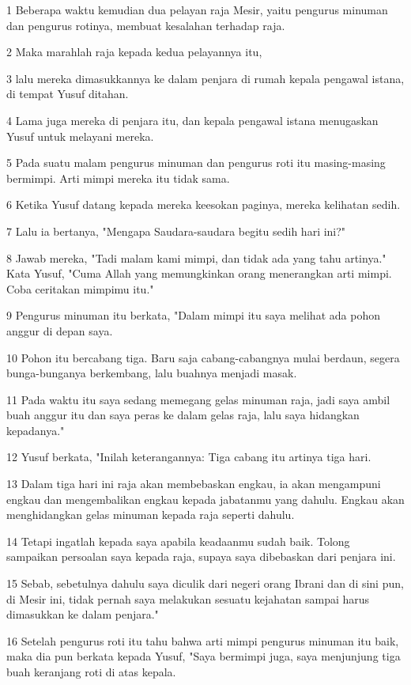 \par 1 Beberapa waktu kemudian dua pelayan raja Mesir, yaitu pengurus minuman dan pengurus rotinya, membuat kesalahan terhadap raja.
\par 2 Maka marahlah raja kepada kedua pelayannya itu,
\par 3 lalu mereka dimasukkannya ke dalam penjara di rumah kepala pengawal istana, di tempat Yusuf ditahan.
\par 4 Lama juga mereka di penjara itu, dan kepala pengawal istana menugaskan Yusuf untuk melayani mereka.
\par 5 Pada suatu malam pengurus minuman dan pengurus roti itu masing-masing bermimpi. Arti mimpi mereka itu tidak sama.
\par 6 Ketika Yusuf datang kepada mereka keesokan paginya, mereka kelihatan sedih.
\par 7 Lalu ia bertanya, "Mengapa Saudara-saudara begitu sedih hari ini?"
\par 8 Jawab mereka, "Tadi malam kami mimpi, dan tidak ada yang tahu artinya." Kata Yusuf, "Cuma Allah yang memungkinkan orang menerangkan arti mimpi. Coba ceritakan mimpimu itu."
\par 9 Pengurus minuman itu berkata, "Dalam mimpi itu saya melihat ada pohon anggur di depan saya.
\par 10 Pohon itu bercabang tiga. Baru saja cabang-cabangnya mulai berdaun, segera bunga-bunganya berkembang, lalu buahnya menjadi masak.
\par 11 Pada waktu itu saya sedang memegang gelas minuman raja, jadi saya ambil buah anggur itu dan saya peras ke dalam gelas raja, lalu saya hidangkan kepadanya."
\par 12 Yusuf berkata, "Inilah keterangannya: Tiga cabang itu artinya tiga hari.
\par 13 Dalam tiga hari ini raja akan membebaskan engkau, ia akan mengampuni engkau dan mengembalikan engkau kepada jabatanmu yang dahulu. Engkau akan menghidangkan gelas minuman kepada raja seperti dahulu.
\par 14 Tetapi ingatlah kepada saya apabila keadaanmu sudah baik. Tolong sampaikan persoalan saya kepada raja, supaya saya dibebaskan dari penjara ini.
\par 15 Sebab, sebetulnya dahulu saya diculik dari negeri orang Ibrani dan di sini pun, di Mesir ini, tidak pernah saya melakukan sesuatu kejahatan sampai harus dimasukkan ke dalam penjara."
\par 16 Setelah pengurus roti itu tahu bahwa arti mimpi pengurus minuman itu baik, maka dia pun berkata kepada Yusuf, "Saya bermimpi juga, saya menjunjung tiga buah keranjang roti di atas kepala.
